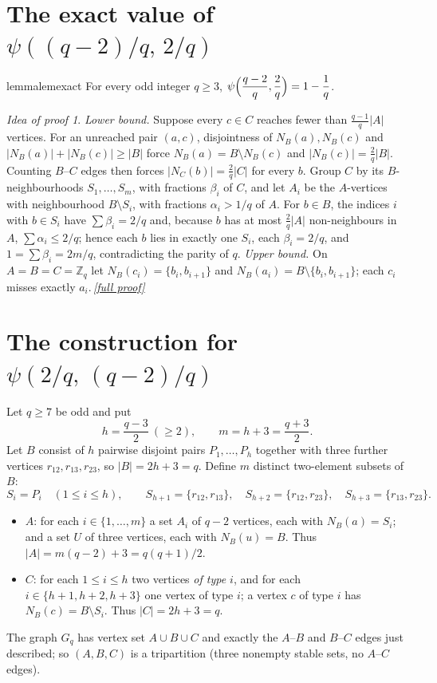 \documentclass[11pt,a4paper]{article}
\theoremstyle{plain}
\theoremstyle{definition}
\theoremstyle{remark}
\newtheorem*{proofidea}{Idea of proof}
\newcommand{\fullproofref}[1]{\,\hyperref[#1]{\textit{[full proof]}}}
\newcommand{\NB}{N_B}
\newcommand{\NC}{N_C}
\newcommand{\Z}{\mathbb Z}
\begin{document}
\section{The exact value of \texorpdfstring{$\psi((q-2)/q,\,2/q)$}{psi((q-2)/q, 2/q)}}\label{sec:lemma}

\begin{restatable}{lemma}{lemexact}\label{lem:exact}
For every odd integer $q\ge3$, $\displaystyle\psi\Bigl(\frac{q-2}q,\frac2q\Bigr)=1-\frac1q$.
\end{restatable}

\begin{proofidea}
\emph{Lower bound.} Suppose every $c\in C$ reaches fewer than $\frac{q-1}q|A|$ vertices. For an unreached pair $(a,c)$, disjointness of $\NB(a),\NB(c)$ and $|\NB(a)|+|\NB(c)|\ge|B|$ force $\NB(a)=B\setminus\NB(c)$ and $|\NB(c)|=\frac2q|B|$. Counting $B$--$C$ edges then forces $|\NC(b)|=\frac2q|C|$ for every $b$. Group $C$ by its $B$-neighbourhoods $S_1,\dots,S_m$, with fractions $\beta_i$ of $C$, and let $A_i$ be the $A$-vertices with neighbourhood $B\setminus S_i$, with fractions $\alpha_i>1/q$ of $A$. For $b\in B$, the indices $i$ with $b\in S_i$ have $\sum\beta_i=2/q$ and, because $b$ has at most $\frac2q|A|$ non-neighbours in $A$, $\sum\alpha_i\le2/q$; hence each $b$ lies in exactly one $S_i$, each $\beta_i=2/q$, and $1=\sum\beta_i=2m/q$, contradicting the parity of $q$.
\emph{Upper bound.} On $A=B=C=\Z_q$ let $\NB(c_i)=\{b_i,b_{i+1}\}$ and $\NB(a_i)=B\setminus\{b_i,b_{i+1}\}$; each $c_i$ misses exactly $a_i$.\fullproofref{pf:exact}
\end{proofidea}

\section{The construction for \texorpdfstring{$\psi(2/q,\,(q-2)/q)$}{psi(2/q, (q-2)/q)}}\label{sec:construction}

Let $q\ge7$ be odd and put
\[
 h=\frac{q-3}2\ (\ge2),\qquad m=h+3=\frac{q+3}2 .
\]
Let $B$ consist of $h$ pairwise disjoint pairs $P_1,\dots,P_h$ together with three further vertices $r_{12},r_{13},r_{23}$, so $|B|=2h+3=q$. Define $m$ distinct two-element subsets of $B$:
\[
 S_i=P_i\quad(1\le i\le h),\qquad S_{h+1}=\{r_{12},r_{13}\},\quad S_{h+2}=\{r_{12},r_{23}\},\quad S_{h+3}=\{r_{13},r_{23}\}.
\]
\begin{itemize}[nosep]
\item $A$: for each $i\in\{1,\dots,m\}$ a set $A_i$ of $q-2$ vertices, each with $\NB(a)=S_i$; and a set $U$ of three vertices, each with $\NB(u)=B$. Thus $|A|=m(q-2)+3=q(q+1)/2$.
\item $C$: for each $1\le i\le h$ two vertices \emph{of type $i$}, and for each $i\in\{h+1,h+2,h+3\}$ one vertex of type $i$; a vertex $c$ of type $i$ has $\NB(c)=B\setminus S_i$. Thus $|C|=2h+3=q$.
\end{itemize}
The graph $G_q$ has vertex set $A\cup B\cup C$ and exactly the $A$--$B$ and $B$--$C$ edges just described; so $(A,B,C)$ is a tripartition (three nonempty stable sets, no $A$--$C$ edges).
\end{document}
